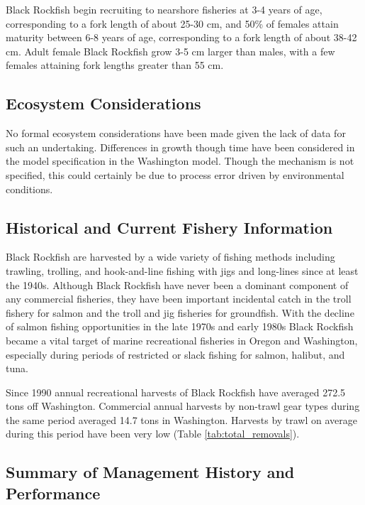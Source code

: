 \documentclass[11pt,
  english,
  letterpaper,
]{article}
\begin{document}
Black Rockfish begin recruiting to nearshore fisheries at 3-4 years of age, corresponding to a fork length of about 25-30 cm, and 50\% of females attain maturity between 6-8 years of age, corresponding to a fork length of about 38-42 cm. Adult female Black Rockfish grow 3-5 cm larger than males, with a few females attaining fork lengths greater than 55 cm.

\hypertarget{ecosystem-considerations-1}{%
\subsection{Ecosystem Considerations}\label{ecosystem-considerations-1}}

No formal ecosystem considerations have been made given the lack of data for such an undertaking. Differences in growth though time have been considered in the model specification in the Washington model. Though the mechanism is not specified, this could certainly be due to process error driven by environmental conditions.

\hypertarget{historical-and-current-fishery-information}{%
\subsection{Historical and Current Fishery Information}\label{historical-and-current-fishery-information}}

Black Rockfish are harvested by a wide variety of fishing methods including trawling, trolling, and hook-and-line fishing with jigs and long-lines since at least the 1940s. Although Black Rockfish have never been a dominant component of any commercial fisheries, they have been important incidental catch in the troll fishery for salmon and the troll and jig fisheries for groundfish. With the decline of salmon fishing opportunities in the late 1970s and early 1980s Black Rockfish became a vital target of marine recreational fisheries in Oregon and Washington, especially during periods of restricted or slack fishing for salmon, halibut, and tuna.

Since 1990 annual recreational harvests of Black Rockfish have averaged 272.5 tons off Washington. Commercial annual harvests by non-trawl gear types during the same period averaged 14.7 tons in Washington. Harvests by trawl on average during this period have been very low (Table \ref{tab:total_removals}).

\hypertarget{summary-of-management-history-and-performance}{%
\subsection{Summary of Management History and Performance}\label{summary-of-management-history-and-performance}}
\end{document}
